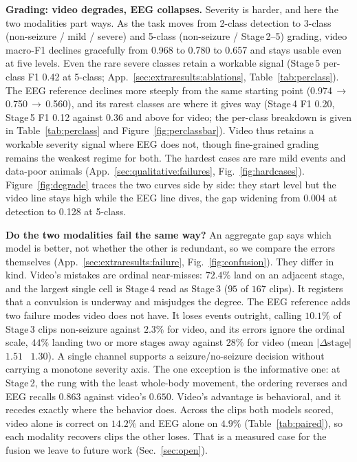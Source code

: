 \noindent\textbf{Grading: video degrades, EEG collapses.}
Severity is harder, and here the two modalities part ways. As the task moves from
2-class detection to 3-class (non-seizure / mild / severe) and 5-class
(non-seizure / Stage\,2--5) grading, video macro-F1 declines gracefully from
0.968 to 0.780 to 0.657 and stays usable even at five levels. Even the rare severe
classes retain a workable signal (Stage\,5 per-class F1 0.42 at 5-class;
App.~\ref{sec:extraresults:ablations}, Table~\ref{tab:perclass}). The EEG reference
declines more steeply from the same starting point
(0.974\,$\to$\,0.750\,$\to$\,0.560), and its rarest classes are where it gives way
(Stage\,4 F1 0.20, Stage\,5 F1 0.12 against 0.36 and above for video; the per-class
breakdown is given in Table~\ref{tab:perclass} and Figure~\ref{fig:perclassbar}).
Video thus retains a workable severity signal where EEG does not, though
fine-grained grading remains the weakest regime for both. The hardest cases are
rare mild events and data-poor animals (App.~\ref{sec:qualitative:failures},
Fig.~\ref{fig:hardcases}). Figure~\ref{fig:degrade} traces the two
curves side by side: they start level but the video line stays high while the EEG
line dives, the gap widening from 0.004 at detection to 0.128 at 5-class.

\noindent\textbf{Do the two modalities fail the same way?}
An aggregate gap says which model is better, not whether the other is redundant, so
we compare the errors themselves (App.~\ref{sec:extraresults:failure},
Fig.~\ref{fig:confusion}). They differ in kind. Video's mistakes are ordinal
near-misses: $72.4\%$ land on an adjacent stage, and the largest single cell is
Stage\,4 read as Stage\,3 ($95$ of $167$ clips). It registers that a convulsion is
underway and misjudges the degree. The EEG reference adds two failure modes video
does not have. It loses events outright, calling $10.1\%$ of Stage\,3 clips non-seizure against $2.3\%$ for video, and its errors ignore the ordinal scale,
$44\%$ landing two or more stages away against $28\%$ for video (mean
$|\Delta\text{stage}|$ $1.51$ \vs\ $1.30$). A single channel supports a
seizure/no-seizure decision without carrying a monotone severity axis. The one
exception is the informative one: at Stage\,2, the rung with the least whole-body
movement, the ordering reverses and EEG recalls $0.863$ against video's $0.650$.
Video's advantage is behavioral, and it recedes exactly where the behavior does.
Across the clips both models scored, video alone is correct on $14.2\%$ and EEG
alone on $4.9\%$ (Table~\ref{tab:paired}), so each modality recovers clips the other
loses. That is a measured case for the fusion we leave to future work
(Sec.~\ref{sec:open}).

